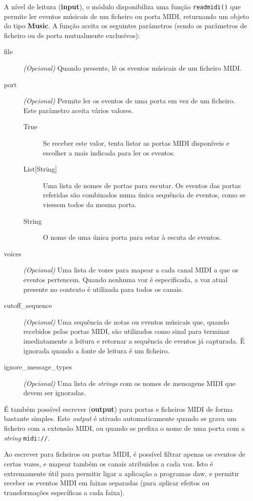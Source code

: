 A nível de leitura (\textbf{input}), o módulo disponibiliza uma função \texttt{readmidi()} que permite ler eventos músicais de um ficheiro ou porta MIDI, returnando um objeto do tipo \textbf{Music}. A função aceita os seguintes parâmetros (sendo os parâmetros de ficheiro ou de porta mutualmente exclusivos):

\begin{description}
 \item[file] \textit{(Opcional)} Quando presente, lê os eventos músicais de um ficheiro MIDI.
 \item[port] \textit{(Opcional)} Permite ler os eventos de uma porta em vez de um ficheiro. Este parâmetro aceita vários valores.
 \begin{description}
  \item[True] Se receber este valor, tenta listar as portas MIDI disponíveis e escolher a mais indicada para ler os eventos.
  \item[List{[String]}] Uma lista de nomes de portas para escutar. Os eventos das portas referidas são combinados numa única sequência de eventos, como se viessem todos da mesma porta.
  \item[String] O nome de uma única porta para estar à escuta de eventos.
 \end{description}
 \item[voices] \textit{(Opcional)} Uma lista de vozes para mapear a cada canal MIDI a que os eventos pertencem. Quando nenhuma voz é especificada, a voz atual presente no contexto é utilizada para todos os canais.
 \item[cutoff\_sequence] \textit{(Opcional)} Uma sequência de notas ou eventos músicais que, quando recebidos pelas portas MIDI, são utilizados como sinal para terminar imediatamente a leitura e retornar a sequência de eventos já capturada. È ignorada quando a fonte de leitura é um ficheiro.
 \item[ignore\_message\_types] \textit{(Opcional)} Uma lista de \textit{strings} com os nomes de mensagens MIDI que devem ser ignoradas.
\end{description}

É também possível escrever (\textbf{output}) para portas e ficheiros MIDI de forma bastante simples. Este \textit{output} é ativado automaticamente quando se grava um ficheiro com a extensão MIDI, ou quando se prefixa o nome de uma porta com a \textit{string} \texttt{midi://}.

Ao escrever para ficheiros ou portas MIDI, é possível filtrar apenas os eventos de certas vozes, e mapear também os canais atribuidos a cada voz. Isto é extremamente útil para permitir ligar a aplicação a programas \acrshort{daw}, e permitir receber os eventos MIDI em faixas separadas (para aplicar efeitos ou transformações específicas a cada faixa).

